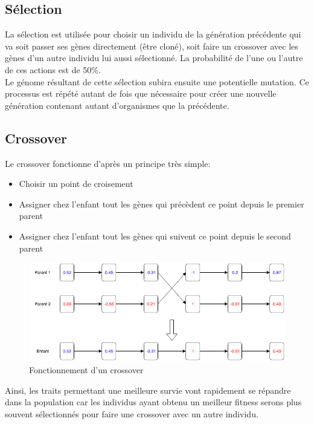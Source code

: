 \documentclass{article}
\begin{document}
\subsection{Sélection}

La sélection est utilisée pour choisir un individu de la génération précédente qui va soit passer ses gènes directement (être cloné), soit faire un crossover avec les gènes d'un autre individu lui aussi sélectionné. La probabilité de l'une ou l'autre de ces actions est de 50\%.\\
Le génome résultant de cette sélection subira ensuite une potentielle mutation. Ce processus est répété autant de fois que nécessaire pour créer une nouvelle génération contenant autant d'organismes que la précédente.

\subsection{Crossover}

Le crossover fonctionne d'après un principe très simple:\\
\begin{itemize}
\item Choisir un point de croisement
\item Assigner chez l'enfant tout les gènes qui précèdent ce point depuis le premier parent
\item Assigner chez l'enfant tout les gènes qui suivent ce point depuis le second parent
\end{itemize}

\begin{figure}[H]
\begin{center}
	\includegraphics[scale=0.6]{"crossover.png"} 
	\caption{Fonctionnement d'un crossover}
\end{center}
\end{figure}

Ainsi, les traits permettant une meilleure survie vont rapidement se répandre dans la population car les individus ayant obtenu un meilleur fitness serons plus souvent sélectionnés pour faire une crossover avec un autre individu.
\end{document}
